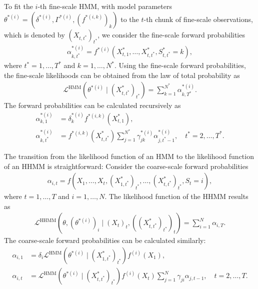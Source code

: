\documentclass[article,shortnames]{jss}
\begin{document}
To fit the $i$-th fine-scale HMM, with model parameters $\theta^{*(i)}=(\delta^{*(i)}, \Gamma^{*(i)},(f^{*(i,k)})_k)$ to the $t$-th chunk of fine-scale observations, which is denoted by $(X_{t,t^*})_{t^*}$, we consider the fine-scale forward probabilities 
\begin{align*}
\alpha^{*(i)}_{k,t^*}=f^{*(i)}(X^*_{t,1},\dots,X^*_{t,t^*}, S^*_{t,t^*}=k),
\end{align*}
where $t^*=1,\dots,T^*$ and $k=1,\dots,N^*$. Using the fine-scale forward probabilities, the fine-scale likelihoods can be obtained from the law of total probability as
\begin{align*}
\mathcal{L}^\text{HMM}(\theta^{*(i)}\mid (X^*_{t,t^*})_{t^*})=\sum_{k=1}^{N^*}\alpha^{*(i)}_{k,T^*}.
\end{align*}
The forward probabilities can be calculated recursively as
\begin{align*}
\alpha^{*(i)}_{k,1} &= \delta^{*(i)}_k f^{*(i,k)}(X^*_{t,1}), \\
\alpha^{*(i)}_{k,t^*} &= f^{*(i,k)}(X^*_{t,t^*})\sum_{j=1}^{N^*}\gamma^{*(i)}_{jk}\alpha^{*(i)}_{j,t^*-1}, \quad t^*=2,\dots,T^*.
\end{align*}

The transition from the likelihood function of an HMM to the likelihood function of an HHMM is straightforward: Consider the coarse-scale forward probabilities
\begin{align*}
\alpha_{i,t}=f(X_1,\dots,X_t,(X^*_{1,t^*})_{t^*},\dots,(X^*_{t,t^*})_{t^*}, S_t=i),
\end{align*}
where $t=1,\dots,T$ and $i=1,\dots,N$. The likelihood function of the HHMM results as
\begin{align*}
\mathcal{L}^\text{HHMM}(\theta,(\theta^{*(i)})_i\mid (X_t)_t,((X^*_{t,t^*})_{t^*})_t)=\sum_{i=1}^{N}\alpha_{i,T}.
\end{align*}
The coarse-scale forward probabilities can be calculated similarly:
\begin{align*}
\alpha_{i,1} &= \delta_i \mathcal{L}^\text{HMM}(\theta^{*(i)}\mid (X^*_{1,t^*})_{t^*})f^{(i)}(X_1), \\
\alpha_{i,t} &= \mathcal{L}^\text{HMM}(\theta^{*(i)}\mid (X^*_{t,t^*})_{t^*}) f^{(i)}(X_t)\sum_{j=1}^{N}\gamma_{ji}\alpha_{j,t-1}, \quad t=2,\dots,T.
\end{align*}
\end{document}
